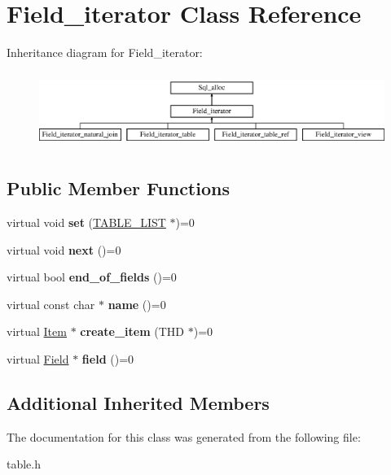 \hypertarget{classField__iterator}{}\section{Field\+\_\+iterator Class Reference}
\label{classField__iterator}
Inheritance diagram for Field\+\_\+iterator\+:\begin{figure}[H]
\begin{center}
\leavevmode
\includegraphics[height=2.500000cm]{classField__iterator}
\end{center}
\end{figure}
\subsection*{Public Member Functions}
\begin{DoxyCompactItemize}
\item 
\mbox{\label{classField__iterator_afc9d884491103593ed56b5d05a3ba708}} 
virtual void {\bfseries set} (\mbox{\hyperlink{structTABLE__LIST}{T\+A\+B\+L\+E\+\_\+\+L\+I\+ST}} $\ast$)=0
\item 
\mbox{\label{classField__iterator_a4415c8ec78df76fb28a52963a9f0a960}} 
virtual void {\bfseries next} ()=0
\item 
\mbox{\label{classField__iterator_af36eb02c3905d901fde09a41dfe0e818}} 
virtual bool {\bfseries end\+\_\+of\+\_\+fields} ()=0
\item 
\mbox{\label{classField__iterator_ad966fb297d06d1e9070d5ad5516eca80}} 
virtual const char $\ast$ {\bfseries name} ()=0
\item 
\mbox{\label{classField__iterator_a2ddc27b9a0c68e1699126d7c107cff17}} 
virtual \mbox{\hyperlink{classItem}{Item}} $\ast$ {\bfseries create\+\_\+item} (T\+HD $\ast$)=0
\item 
\mbox{\label{classField__iterator_a8ad1d1cf66a4210fbfe23850adb9dfc7}} 
virtual \mbox{\hyperlink{classField}{Field}} $\ast$ {\bfseries field} ()=0
\end{DoxyCompactItemize}
\subsection*{Additional Inherited Members}


The documentation for this class was generated from the following file\+:\begin{DoxyCompactItemize}
\item 
table.\+h\end{DoxyCompactItemize}
